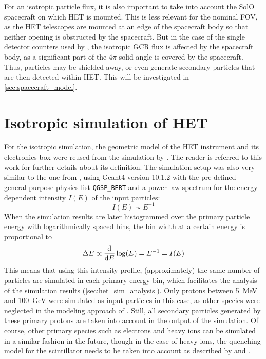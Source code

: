 For an isotropic particle flux, it is also important to take into account the \ac{SolO} spacecraft on which \ac{HET} is mounted. This is less relevant for the nominal \ac{FOV}, as the \ac{HET} telescopes are mounted at an edge of the spacecraft body so that neither opening is obstructed by the spacecraft. But in the case of the single detector counters used by \citet{Forstner-2021-SolO}, the isotropic \ac{GCR} flux is affected by the spacecraft body, as a significant part of the $4\pi$ solid angle is covered by the spacecraft. Thus, particles may be shielded away, or even generate secondary particles that are then detected within \ac{HET}. This will be investigated in \autoref{sec:spacecraft_model}.

\section{Isotropic simulation of HET}
\label{sec:isotropic_sim}

For the isotropic simulation, the geometric model of the \ac{HET} instrument and its electronics box were reused from the simulation by \citet{Elftmann-2020-PhD}. The reader is referred to this work for further details about its definition. The simulation setup was also very similar to the one from \citet{Elftmann-2020-PhD}, using \ac{Geant4} version 10.1.2 with the pre-defined general-purpose physics list \texttt{QGSP\_BERT} and a power law spectrum for the energy-dependent intensity $I(E)$ of the input particles:
\begin{equation}
I(E) \sim E^{-1}
\label{eq:het_g4_spectrum}
\end{equation}
When the simulation results are later histogrammed over the primary particle energy with logarithmically spaced bins, the bin width at a certain energy is proportional to
\begin{equation}
    \Delta E \propto \dv{E} \log(E) = E^{-1} = I(E)
\end{equation}
This means that using this intensity profile, (approximately) the same number of particles are simulated in each primary energy bin, which facilitates the analysis of the simulation results (\autoref{sec:het_sim_analysis}). Only protons between \SI{5}{\mega\electronvolt} and \SI{100}{\giga\electronvolt} were simulated as input particles in this case, as other species were neglected in the modeling approach of \citet{Forstner-2021-SolO}. Still, all secondary particles generated by these primary protons are taken into account in the output of the simulation. Of course, other primary species such as electrons and heavy ions can be simulated in a similar fashion in the future, though in the case of heavy ions, the quenching model for the scintillator needs to be taken into account as described by \citet[Section 5.4]{Elftmann-2020-PhD} and \citet{Tammen-2015}.

